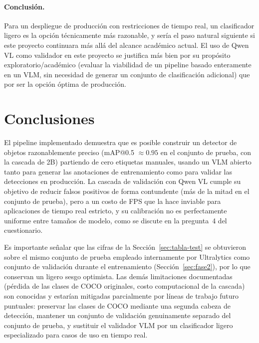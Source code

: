 \documentclass[11pt]{article}
\begin{document}
\paragraph{Conclusión.} Para un despliegue de producción con restricciones de tiempo real, un
clasificador ligero es la opción técnicamente más razonable, y sería el paso natural siguiente
si este proyecto continuara más allá del alcance académico actual. El uso de Qwen VL como
validador en este proyecto se justifica más bien por su propósito exploratorio/académico
(evaluar la viabilidad de un pipeline basado enteramente en un VLM, sin necesidad de generar un
conjunto de clasificación adicional) que por ser la opción óptima de producción.

\section{Conclusiones}

El pipeline implementado demuestra que es posible construir un detector de objetos
razonablemente preciso (mAP@0.5 $\approx 0.95$ en el conjunto de prueba, con la cascada de 2B)
partiendo de cero etiquetas manuales, usando un VLM abierto tanto para generar las anotaciones
de entrenamiento como para validar las detecciones en producción. La cascada de validación con
Qwen VL cumple su objetivo de reducir falsos positivos de forma contundente (más de la mitad en
el conjunto de prueba), pero a un costo de FPS que la hace inviable para aplicaciones de tiempo
real estricto, y su calibración no es perfectamente uniforme entre tamaños de modelo, como se
discute en la pregunta~4 del cuestionario.

Es importante señalar que las cifras de la Sección~\ref{sec:tabla-test} se obtuvieron sobre el
mismo conjunto de prueba empleado internamente por Ultralytics como conjunto de validación
durante el entrenamiento (Sección~\ref{sec:fase2}), por lo que conservan un ligero sesgo
optimista. Las demás limitaciones documentadas (pérdida de las clases de COCO originales, costo
computacional de la cascada) son conocidas y estarían mitigadas parcialmente por líneas de
trabajo futuro puntuales: preservar las clases de COCO mediante una segunda cabeza de detección,
mantener un conjunto de validación genuinamente separado del conjunto de prueba, y sustituir el
validador VLM por un clasificador ligero especializado para casos de uso en tiempo real.
\end{document}
